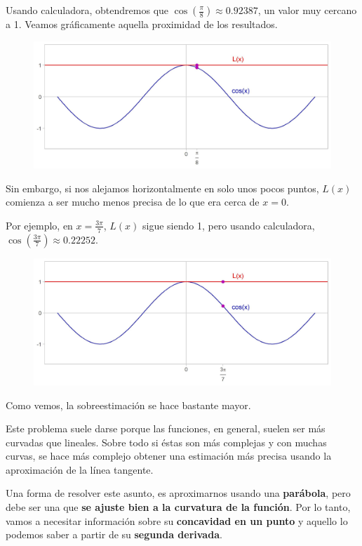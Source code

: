 \documentclass[12pt]{article}
\begin{document}
Usando calculadora, obtendremos que $\cos\left(\frac{\pi}{8}\right) \approx 0.92387$, un valor muy cercano a 1. Veamos gráficamente aquella proximidad de los resultados.

\begin{figure}[hbt!]
\includegraphics[scale=0.7]{img/quad_approx_1.jpg}
\centering
\end{figure}

Sin embargo, si nos alejamos horizontalmente en solo unos pocos puntos, $L(x)$ comienza a ser mucho menos precisa de lo que era cerca de $x = 0$.

Por ejemplo, en $x = \frac{3\pi}{7}$, $L(x)$ sigue siendo 1, pero usando calculadora, $\cos\left(\frac{3\pi}{7}\right) \approx 0.22252$.

\begin{figure}[hbt!]
\includegraphics[scale=0.7]{img/quad_approx_2.jpg}
\centering
\end{figure}

Como vemos, la sobreestimación se hace bastante mayor.

Este problema suele darse porque las funciones, en general, suelen ser más curvadas que lineales. Sobre todo si éstas son más complejas y con muchas curvas, se hace más complejo obtener una estimación más precisa usando la aproximación de la línea tangente.

Una forma de resolver este asunto, es aproximarnos usando una \textbf{parábola}, pero debe ser una que \textbf{se ajuste bien a la curvatura de la función}. Por lo tanto, vamos a necesitar información sobre su \textbf{concavidad en un punto} y aquello lo podemos saber a partir de su \textbf{segunda derivada}.
\end{document}
